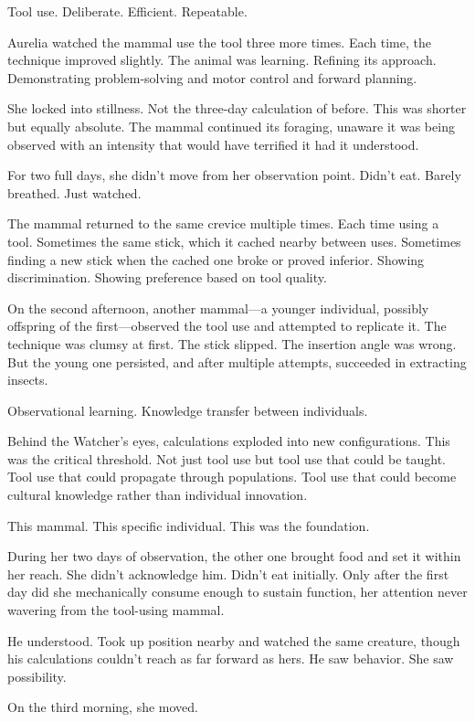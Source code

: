 Tool use. Deliberate. Efficient. Repeatable.

Aurelia watched the mammal use the tool three more times. Each time, the technique improved slightly. The animal was learning. Refining its approach. Demonstrating problem-solving and motor control and forward planning.

She locked into stillness. Not the three-day calculation of before. This was shorter but equally absolute. The mammal continued its foraging, unaware it was being observed with an intensity that would have terrified it had it understood.

For two full days, she didn't move from her observation point. Didn't eat. Barely breathed. Just watched.

The mammal returned to the same crevice multiple times. Each time using a tool. Sometimes the same stick, which it cached nearby between uses. Sometimes finding a new stick when the cached one broke or proved inferior. Showing discrimination. Showing preference based on tool quality.

On the second afternoon, another mammal—a younger individual, possibly offspring of the first—observed the tool use and attempted to replicate it. The technique was clumsy at first. The stick slipped. The insertion angle was wrong. But the young one persisted, and after multiple attempts, succeeded in extracting insects.

Observational learning. Knowledge transfer between individuals.

Behind the Watcher's eyes, calculations exploded into new configurations. This was the critical threshold. Not just tool use but tool use that could be taught. Tool use that could propagate through populations. Tool use that could become cultural knowledge rather than individual innovation.

This mammal. This specific individual. This was the foundation.

During her two days of observation, the other one brought food and set it within her reach. She didn't acknowledge him. Didn't eat initially. Only after the first day did she mechanically consume enough to sustain function, her attention never wavering from the tool-using mammal.

He understood. Took up position nearby and watched the same creature, though his calculations couldn't reach as far forward as hers. He saw behavior. She saw possibility.

On the third morning, she moved.

